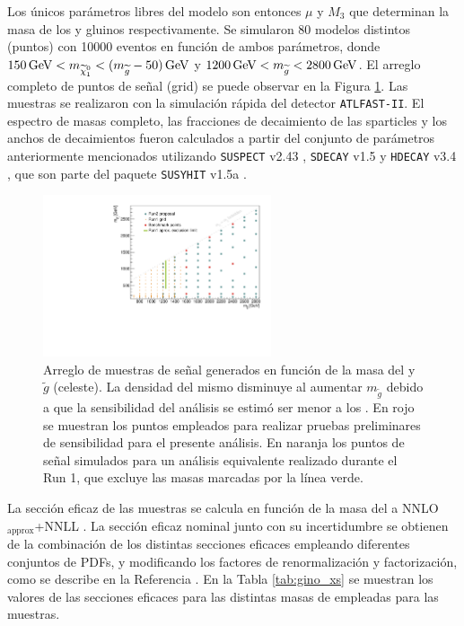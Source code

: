 Los únicos parámetros libres del modelo son entonces $\mu$ y $M_3$ que determinan la masa de los \ninoone y gluinos respectivamente. Se simularon 80 modelos distintos (puntos) con 10000 eventos en función de ambos parámetros, donde $150\,\gev<m_{\ninoone}<(m_{\gluino}-50)\,\gev$ y $1200\,\text{GeV} < m_{\widetilde{g}}<2800\,\text{GeV}$. El arreglo completo de puntos de señal (grid) se puede observar en la Figura \ref{fig:grid_points}. Las muestras se realizaron con la simulación rápida del detector \texttt{ATLFAST-II}. El espectro de masas completo, las fracciones de decaimiento de las sparticles y los anchos de decaimientos fueron calculados a partir del conjunto de parámetros anteriormente mencionados utilizando {\texttt{SUSPECT} v2.43} \cite{Djouadi2007426}, {\texttt{SDECAY} v1.5} \cite{Muhlleitner:2004mka} y {\texttt{HDECAY} v3.4} \cite{Djouadi:1997yw}, que son parte del paquete {\texttt{SUSYHIT} v1.5a} \cite{Djouadi:2006bz}.


\begin{figure}
  \centering
  \includegraphics[width=0.6\textwidth]{images/analysis/phb_grid.pdf}
  \caption{Arreglo de muestras de señal generados en función de la masa del \ninoone y $\tilde{g}$ (celeste). La densidad del mismo disminuye al aumentar $m_{\tilde{g}}$ debido a que la sensibilidad del análisis se estimó ser menor a los . En rojo se muestran los puntos empleados para realizar pruebas preliminares de sensibilidad para el presente análisis. En naranja los puntos de señal simulados para un análisis equivalente realizado durante el Run 1, que excluye las masas marcadas por la línea verde.}
  \label{fig:grid_points}
\end{figure}

\begin{sloppypar} %
La sección eficaz de las muestras se calcula en función de la masa del \gluino a 
NNLO$_\text{approx}$+NNLL \cite{Beenakker:1996ch, Kulesza:2008jb, Kulesza:2009kq, Beenakker:2009ha, Beenakker:2011fu}. La sección eficaz nominal junto con su incertidumbre se obtienen de la combinación 
de los distintas secciones eficaces empleando diferentes conjuntos de PDFs, y modificando los factores de renormalización y factorización, como se describe en la Referencia \cite{Borschensky:2014cia}. En la Tabla \ref{tab:gino_xs} se muestran los valores de las secciones eficaces para las distintas masas de \gluino empleadas para las muestras.
\end{sloppypar}

